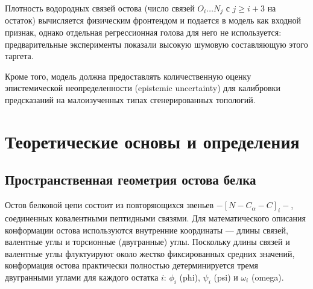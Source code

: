 \documentclass[12pt, a4paper]{article}
\begin{document}
Плотность водородных связей остова (число связей $O_i \ldots N_j$ с $j \ge i+3$ на остаток) вычисляется физическим фронтендом и подается в модель как входной признак, однако отдельная регрессионная голова для него не используется: предварительные эксперименты показали высокую шумовую составляющую этого таргета.

Кроме того, модель должна предоставлять количественную оценку эпистемической неопределенности (epistemic uncertainty) для калибровки предсказаний на малоизученных типах сгенерированных топологий.

\newpage

\section{Теоретические основы и определения}

\subsection{Пространственная геометрия остова белка}
Остов белковой цепи состоит из повторяющихся звеньев $-[N - C_\alpha - C]_i-$, соединенных ковалентными пептидными связями. 
Для математического описания конформации остова используются внутренние координаты — длины связей, валентные углы и торсионные (двугранные) углы. Поскольку длины связей и валентные углы флуктуируют около жестко фиксированных средних значений, конформация остова практически полностью детерминируется тремя двугранными углами для каждого остатка $i$: $\phi_i$ (phi), $\psi_i$ (psi) и $\omega_i$ (omega).
\end{document}

